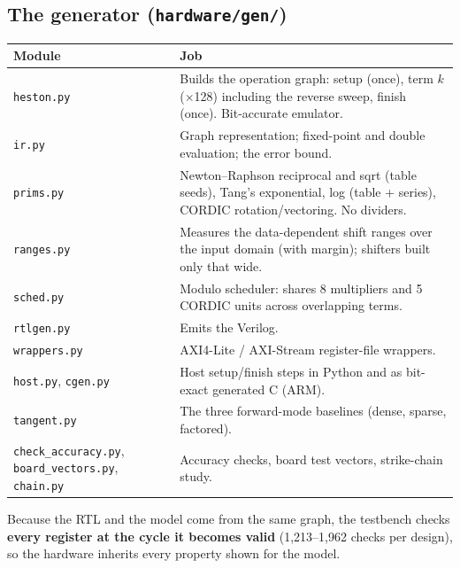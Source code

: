\documentclass[11pt,a4paper]{article}
\begin{document}
\subsection{The generator (\texttt{hardware/gen/})}
\begin{center}\small
\begin{tabular}{@{}L{3.6cm}L{11.8cm}@{}}
\toprule
\textbf{Module} & \textbf{Job}\\
\midrule
\texttt{heston.py} & Builds the operation graph: setup (once), term $k$ ($\times$128) including the reverse sweep, finish (once). Bit-accurate emulator.\\
\texttt{ir.py} & Graph representation; fixed-point and double evaluation; the error bound.\\
\texttt{prims.py} & Newton--Raphson reciprocal and sqrt (table seeds), Tang's exponential, log (table + series), CORDIC rotation/vectoring. No dividers.\\
\texttt{ranges.py} & Measures the data-dependent shift ranges over the input domain (with margin); shifters built only that wide.\\
\texttt{sched.py} & Modulo scheduler: shares 8 multipliers and 5 CORDIC units across overlapping terms.\\
\texttt{rtlgen.py} & Emits the Verilog.\\
\texttt{wrappers.py} & AXI4-Lite / AXI-Stream register-file wrappers.\\
\texttt{host.py}, \texttt{cgen.py} & Host setup/finish steps in Python and as bit-exact generated C (ARM).\\
\texttt{tangent.py} & The three forward-mode baselines (dense, sparse, factored).\\
\texttt{check\_accuracy.py}, \texttt{board\_vectors.py}, \texttt{chain.py} & Accuracy checks, board test vectors, strike-chain study.\\
\bottomrule
\end{tabular}
\end{center}
Because the RTL and the model come from the same graph, the testbench checks \textbf{every
register at the cycle it becomes valid} (1,213--1,962 checks per design), so the hardware
inherits every property shown for the model.
\end{document}
